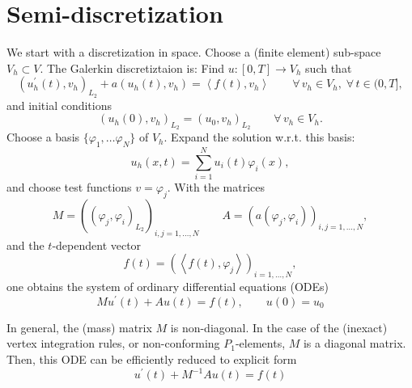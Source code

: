 \section{Semi-discretization}
We start with a discretization in space. Choose a (finite element) sub-space $V_h \subset V$.
The Galerkin discretiztaion is: Find $u : [0,T] \rightarrow V_h$ such that
$$
(u_h^\prime(t), v_h)_{L_2} + a(u_h(t), v_h) = \left<f(t), v_h\right> 
\qquad \forall \, v_h \in V_h, \; \forall \, t \in (0,T],
$$
and initial conditions
$$
(u_h(0), v_h)_{L_2} = (u_0, v_h)_{L_2} \qquad \forall \, v_h \in V_h.
$$
Choose a basis $\{ \varphi_1, \ldots \varphi_N \}$ of $V_h$. Expand the solution w.r.t. this
basis:
$$
u_h(x,t) = \sum_{i=1}^N u_i(t) \varphi_i(x),
$$
and choose test functions $v = \varphi_j$. With the matrices
$$
M = \left( (\varphi_j, \varphi_i)_{L_2} \right)_{i,j=1,\ldots, N} \qquad
A = \left( a(\varphi_j, \varphi_i) \right)_{i,j=1,\ldots, N},
$$
and the $t$-dependent vector
$$
f(t) = \left( \left<f(t), \varphi_j\right> \right)_{i=1,\ldots,N},
$$
one obtains the system of ordinary differential equations (ODEs)
$$
M u^\prime (t) + A u(t) = f(t), \qquad u(0) = u_0
$$

In general, the (mass) matrix $M$ is non-diagonal. In the case of the (inexact) 
vertex integration rules, or non-conforming $P_1$-elements, $M$ is a diagonal matrix.
Then, this ODE can be efficiently reduced to explicit form
$$
u^\prime(t) + M^{-1} A u(t) = f(t)
$$

\bigskip

